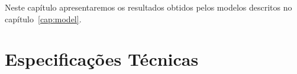 Neste capítulo apresentaremos os resultados obtidos pelos modelos
descritos no capítulo~\ref{cap:model}.

\section{Especificações Técnicas}
\label{sec:tspec}





